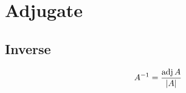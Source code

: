\section{Adjugate}

  \subsection{Inverse}
  
    \begin{equation}
      A^{-1} = \frac{ \operatorname{adj}{A} }{ \left| A \right| }
    \end{equation}
